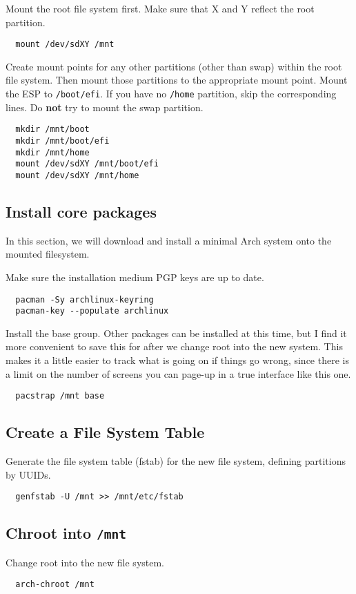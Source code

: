 \documentclass[letterpaper,12pt]{article}
\newcommand{\p}{\par\bigskip}
\begin{document}
Mount the root file system first. Make sure that X and Y reflect the root partition.
\begin{lstlisting}
  mount /dev/sdXY /mnt
\end{lstlisting} \p

Create mount points for any other partitions (other than swap) within the root file system. Then mount those partitions to the appropriate mount point. Mount the ESP to {\tt /boot/efi}. If you have no {\tt /home} partition, skip the corresponding lines.  Do {\bf not} try to mount the swap partition.
\begin{lstlisting}
  mkdir /mnt/boot
  mkdir /mnt/boot/efi
  mkdir /mnt/home
  mount /dev/sdXY /mnt/boot/efi
  mount /dev/sdXY /mnt/home
\end{lstlisting}


\subsection{Install core packages}
In this section, we will download and install a minimal Arch system onto the mounted filesystem. \p

Make sure the installation medium PGP keys are up to date.
\begin{lstlisting}
  pacman -Sy archlinux-keyring
  pacman-key --populate archlinux
\end{lstlisting} \p

Install the base group. Other packages can be installed at this time, but I find it more convenient to save this for after we change root into the new system. This makes it a little easier to track what is going on if things go wrong, since there is a limit on the number of screens you can page-up in a true interface like this one.
\begin{lstlisting}
  pacstrap /mnt base
\end{lstlisting}

\subsection{Create a File System Table}
Generate the file system table (fstab) for the new file system, defining partitions by UUIDs.
\begin{lstlisting}
  genfstab -U /mnt >> /mnt/etc/fstab
\end{lstlisting}

\subsection{Chroot into {\tt /mnt}}
Change root into the new file system.
\begin{lstlisting}
  arch-chroot /mnt
\end{lstlisting}
\end{document}

